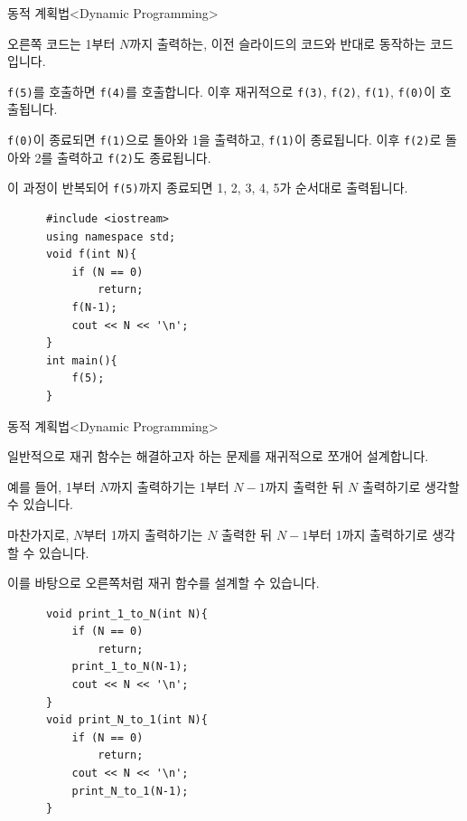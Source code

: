 \begin{frame}[fragile]{동적 계획법}{<Dynamic Programming>}
  \begin{twocol}
    오른쪽 코드는 1부터 $N$까지 출력하는, 이전 슬라이드의 코드와 반대로 동작하는 코드입니다.\par\vspace{1mm}
    \texttt{f(5)}를 호출하면 \texttt{f(4)}를 호출합니다. 이후 재귀적으로
    \texttt{f(3)}, \texttt{f(2)}, \texttt{f(1)}, \texttt{f(0)}이 호출됩니다.\par\vspace{1mm}
    \texttt{f(0)}이 종료되면 \texttt{f(1)}으로 돌아와 1을 출력하고, \texttt{f(1)}이 종료됩니다.
    이후 \texttt{f(2)}로 돌아와 2를 출력하고 \texttt{f(2)}도 종료됩니다.\par\vspace{1mm}
    이 과정이 반복되어 \texttt{f(5)}까지 종료되면 1, 2, 3, 4, 5가 순서대로 출력됩니다.
  \colsplit
    \begin{verbatim}
      #include <iostream>
      using namespace std;
      void f(int N){
          if (N == 0)
              return;
          f(N-1);
          cout << N << '\n';
      }
      int main(){
          f(5);
      }
    \end{verbatim}
  \end{twocol}
\end{frame}

\begin{frame}[fragile]{동적 계획법}{<Dynamic Programming>}
  \begin{twocol}
    일반적으로 재귀 함수는 해결하고자 하는 문제를 재귀적으로 쪼개어 설계합니다.\par\vspace{1mm}
    예를 들어, \alert{1부터 $N$까지 출력하기}는 1부터 $N-1$까지 출력한 뒤 $N$ 출력하기로
    생각할 수 있습니다.\par\vspace{1mm}
    마찬가지로, \alert{$N$부터 1까지 출력하기}는 $N$ 출력한 뒤 $N-1$부터 1까지 출력하기로
    생각할 수 있습니다.\par\vspace{1mm}
    이를 바탕으로 오른쪽처럼 재귀 함수를 설계할 수 있습니다.
  \colsplit
    \begin{verbatim}
      void print_1_to_N(int N){
          if (N == 0)
              return;
          print_1_to_N(N-1);
          cout << N << '\n';
      }
      void print_N_to_1(int N){
          if (N == 0)
              return;
          cout << N << '\n';
          print_N_to_1(N-1);
      }
    \end{verbatim}
  \end{twocol}
\end{frame}

